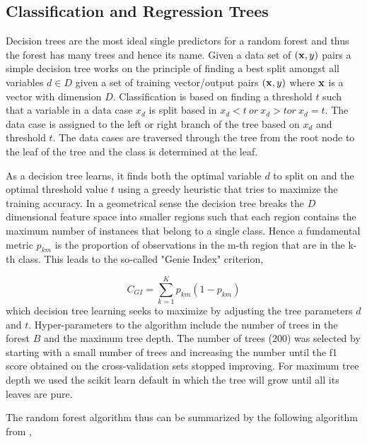 \documentclass[proposal]{umassthesis}
\begin{document}
\subsection{Classification and Regression Trees}

Decision trees are the most ideal single predictors for a random forest and thus the forest has many trees and hence its name. Given a data set of $(\bold{x},y)$ pairs a simple decision tree works on the principle of finding a best split amongst all variables $d \in D$ given a set of training vector/output pairs $(\bold{x},y)$ where $\bold{x}$ is a vector with dimension $D$. Classification is based on finding a threshold $t$ such that a variable in a data case $x_d$ is split based in $x_d < t \ or \ x_d > t or \ x_d =t$. The data case is assigned to the left or right branch of the tree based on $x_d$ and threshold $t$. The data cases are traversed through the tree from the root node to the leaf of the tree and the class is determined at the leaf.

As a decision tree learns, it finds both the optimal variable $d$ to split on and the optimal threshold value $t$ using a greedy heuristic that tries to maximize the training accuracy. In a geometrical sense the decision tree breaks the $D$ dimensional feature space into smaller regions such that each region contains the maximum number of instances that belong to a single class. Hence a fundamental metric $p_{km}$ is the proportion of observations in the m-th region that are in the k-th class. This leads to the so-called "Genie Index" criterion,

\begin{equation}
C_{GI} =  \sum_{k=1}^{K} p_{km} (1 - p_{km})
\end{equation}
which decision tree learning seeks to maximize by adjusting the tree parameters $d$ and $t$. Hyper-parameters to the algorithm include the number of trees in the forest $B$ and the maximum tree depth. The number of trees (200) was selected by starting with a small number of trees and increasing the number until the f1 score obtained on the cross-validation sets stopped improving. For maximum tree depth we used the scikit learn default in which the tree will grow until all its leaves are pure\cite{pedregosa2011scikit}.

The random forest algorithm thus can be summarized by the following algorithm from \cite{friedman2001elements},
 
\end{document}
